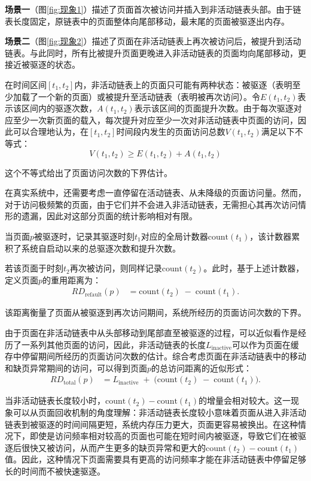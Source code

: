 \textbf{场景一}（图\ref{fig:现象1}）描述了页面首次被访问并插入到非活动链表头部。由于链表长度固定，原链表中的页面整体向尾部移动，最末尾的页面被驱逐出内存。

\textbf{场景二}（图\ref{fig:现象2}）描述了页面在非活动链表上再次被访问后，被提升到活动链表。与此同时，所有比被提升页面更晚进入非活动链表的页面均向尾部移动，更接近被驱逐的状态。

在时间区间\([t_1, t_2]\)内，非活动链表上的页面只可能有两种状态：被驱逐（表明至少加载了一个新的页面）或被提升至活动链表（表明被再次访问）。令\(E(t_1,t_2)\)表示该区间内的驱逐次数，\(A(t_1,t_2)\)表示该区间的页面提升次数。由于每次驱逐对应至少一次新页面的载入，每次提升对应至少一次对非活动链表中页面的访问，因此可以合理地认为，在\([t_1,t_2]\)时间段内发生的页面访问总数\(V(t_1, t_2)\)满足以下不等式：
\[
V(t_1, t_2) \ge E(t_1,t_2) + A(t_1,t_2)
\]

这个不等式给出了页面访问次数的下界估计。

在真实系统中，还需要考虑一直停留在活动链表、从未降级的页面访问量。然而，对于访问极频繁的页面，由于它们并不会进入非活动链表，无需担心其再次访问情形的遗漏，因此对这部分页面的统计影响相对有限。

当页面\(p\)被驱逐时，记录其驱逐时刻\(t_1\)对应的全局计数器\(\mathrm{count}(t_1)\)，该计数器累积了系统自启动以来的总驱逐次数和提升次数。

若该页面于时刻\(t_2\)再次被访问，则同样记录\(\mathrm{count}(t_2)\)。此时，基于上述计数器，定义页面\(p\)的重用距离为：
\begin{align}
  \label{eq:refault_distance}
  RD_{\mathrm{refault}}(p)
  &= 
  \mathrm{count}(t_2)
  \;-\;
  \mathrm{count}(t_1).
\end{align}

该距离衡量了页面从被驱逐到再次访问期间，系统所经历的页面访问次数的下界。

由于页面在非活动链表中从头部移动到尾部直至被驱逐的过程，可以近似看作是经历了一系列其他页面的访问，因此，非活动链表的长度\(L_{\mathrm{inactive}}\)可以作为页面在缓存中停留期间所经历的页面访问次数的估计。综合考虑页面在非活动链表中的移动和缺页异常期间的访问，可以得到页面\(p\)的总访问距离的近似形式：
\begin{align}
  \label{eq:dtotal}
  RD_{\mathrm{total}}(p)
  &= 
  L_{\mathrm{inactive}}
  \;+\;
  \bigl(\mathrm{count}(t_2) \;-\; \mathrm{count}(t_1)\bigr).
\end{align}

当非活动链表长度较小时，\(\mathrm{count}(t_2) - \mathrm{count}(t_1)\)的增量会相对较大。这一现象可以从页面回收机制的角度理解：非活动链表长度较小意味着页面从进入非活动链表到被驱逐的时间间隔更短，系统内存压力更大，页面更容易被换出。在这种情况下，即使是访问频率相对较高的页面也可能在短时间内被驱逐，导致它们在被驱逐后很快又被访问，从而产生更多的缺页异常和更大的\(\mathrm{count}(t_2) - \mathrm{count}(t_1)\)值。因此，这种情况下页面需要具有更高的访问频率才能在非活动链表中停留足够长的时间而不被快速驱逐。

